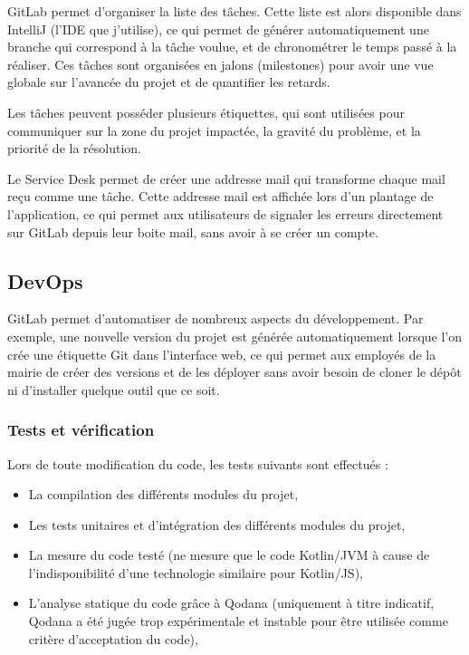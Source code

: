GitLab permet d'organiser la liste des tâches.
Cette liste est alors disponible dans IntelliJ (l'IDE que j'utilise), ce qui permet de générer automatiquement une branche qui correspond à la tâche voulue, et de chronométrer le temps passé à la réaliser.
Ces tâches sont organisées en jalons (milestones) pour avoir une vue globale sur l'avancée du projet et de quantifier les retards.

Les tâches peuvent posséder plusieurs étiquettes, qui sont utilisées pour communiquer sur la zone du projet impactée, la gravité du problème, et la priorité de la résolution.

Le Service Desk permet de créer une addresse mail qui transforme chaque mail reçu comme une tâche.
Cette addresse mail est affichée lors d'un plantage de l'application, ce qui permet aux utilisateurs de signaler les erreurs directement sur GitLab depuis leur boite mail, sans avoir à se créer un compte.

\subsection{DevOps}\label{subsec:devops}

GitLab permet d'automatiser de nombreux aspects du développement.
Par exemple, une nouvelle version du projet est générée automatiquement lorsque l'on crée une étiquette Git dans l'interface web, ce qui permet aux employés de la mairie de créer des versions et de les déployer sans avoir besoin de cloner le dépôt ni d'installer quelque outil que ce soit.

\subsubsection{Tests et vérification}

Lors de toute modification du code, les tests suivants sont effectués :
\begin{itemize}
	\item La compilation des différents modules du projet,
	\item Les tests unitaires et d'intégration des différents modules du projet,
	\item La mesure du code testé (ne mesure que le code Kotlin/JVM à cause de l'indisponibilité d'une technologie similaire pour Kotlin/JS),
	\item L'analyse statique du code grâce à Qodana (uniquement à titre indicatif, Qodana a été jugée trop expérimentale et instable pour être utilisée comme critère d'acceptation du code),
\end{itemize}

